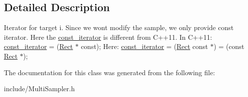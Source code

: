 \subsection{Detailed Description}
Iterator for target i. Since we won\textquotesingle{}t modify the sample, we only provide const iterator. Here the \hyperlink{classMultiSampler_1_1const__iterator}{const\+\_\+iterator} is different from C++11. In C++11\+: \hyperlink{classMultiSampler_1_1const__iterator}{const\+\_\+iterator} = (\hyperlink{classRect}{Rect} $\ast$ const); Here\+: \hyperlink{classMultiSampler_1_1const__iterator}{const\+\_\+iterator} = (\hyperlink{classRect}{Rect} const $\ast$) = (const \hyperlink{classRect}{Rect} $\ast$); 

The documentation for this class was generated from the following file\+:\begin{DoxyCompactItemize}
\item 
include/Multi\+Sampler.\+h\end{DoxyCompactItemize}
